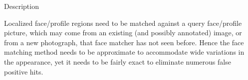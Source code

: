 

\begin{xpsectionbox}{Description}{}

Localized face/profile regions  need to be matched against a query face/profile picture, which may come from an existing (and possibly annotated) image, or from a new photograph, that face matcher has not seen before. Hence the face matching method needs to be approximate to accommodate wide variations in the appearance, yet it needs to be fairly exact to eliminate numerous false positive hits.

%
%
%
\end{xpsectionbox}

